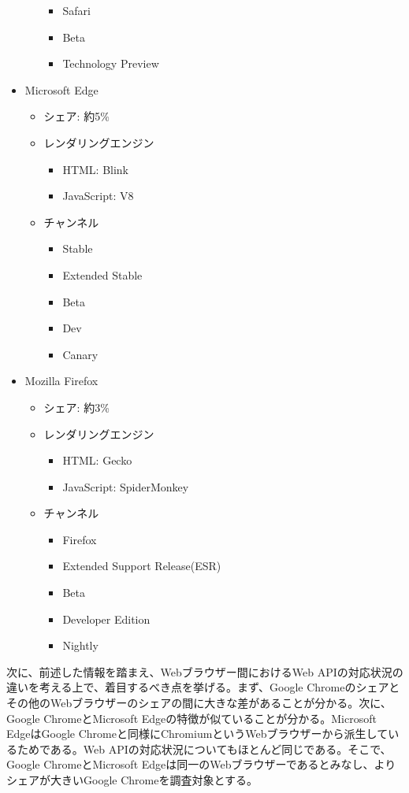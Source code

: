 \begin{itemize}
\begin{itemize}
\begin{itemize}
            \item Safari
            \item Beta
            \item Technology Preview
        \end{itemize}
    \end{itemize}
    \item Microsoft Edge
    \begin{itemize}
        \item シェア: 約5\%
        \item レンダリングエンジン
        \begin{itemize}
            \item HTML: Blink
            \item JavaScript: V8
        \end{itemize}
        \item チャンネル~\cite{MicrosoftEdgeChannels}
        \begin{itemize}
            \item Stable
            \item Extended Stable
            \item Beta
            \item Dev
            \item Canary
        \end{itemize}
    \end{itemize}
    \item Mozilla Firefox
    \begin{itemize}
        \item シェア: 約3\%
        \item レンダリングエンジン
        \begin{itemize}
            \item HTML: Gecko
            \item JavaScript: SpiderMonkey
        \end{itemize}
        \item チャンネル~\cite{MozillaFirefoxChannels}
        \begin{itemize}
            \item Firefox
            \item Extended Support Release(ESR)
            \item Beta
            \item Developer Edition
            \item Nightly
        \end{itemize}
    \end{itemize}
\end{itemize}
次に、前述した情報を踏まえ、Webブラウザー間におけるWeb APIの対応状況の違いを考える上で、着目するべき点を挙げる。まず、Google Chromeのシェアとその他のWebブラウザーのシェアの間に大きな差があることが分かる。次に、Google ChromeとMicrosoft Edgeの特徴が似ていることが分かる。Microsoft EdgeはGoogle Chromeと同様にChromiumというWebブラウザーから派生しているためである。Web APIの対応状況についてもほとんど同じである。そこで、Google ChromeとMicrosoft Edgeは同一のWebブラウザーであるとみなし、よりシェアが大きいGoogle Chromeを調査対象とする。

